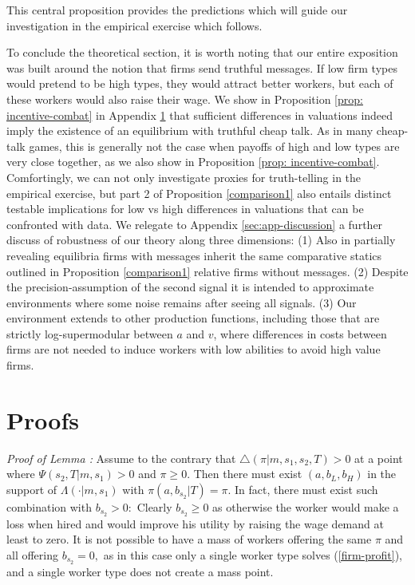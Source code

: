 \documentclass[12pt]{article}
\theoremstyle{plain}
\begin{document}
This central proposition provides the predictions which will guide our
investigation in the empirical exercise which follows. 

To conclude the theoretical section, it is worth noting
that our entire exposition was built around the notion that firms send truthful messages. If low firm types would pretend to be high types, they would attract better workers, but each of these workers would also raise their wage. We show in Proposition \ref{prop: incentive-combat} in Appendix \ref{sec:proofs} that sufficient differences in valuations indeed imply the
existence of an equilibrium with truthful cheap talk. As in
many cheap-talk games, this is generally not the case when payoffs of high
and low types are very close together, as we also show in Proposition \ref{prop: incentive-combat}. Comfortingly, we can not only investigate proxies for truth-telling in the empirical exercise, but part 2 of Proposition \ref{comparison1} also entails distinct testable implications for low vs high differences in valuations that can be confronted with data. We relegate to Appendix \ref{sec:app-discussion} a further discuss of robustness of our theory along three dimensions: (1) Also in partially revealing equilibria firms with messages inherit the same comparative statics outlined in Proposition \ref{comparison1} relative firms without messages. (2) Despite the precision-assumption of the second signal it is intended to approximate environments where some noise remains after seeing all signals. (3) Our environment extends to other production functions, including those that are strictly log-supermodular between $a$ and $v$, where differences in costs between firms are not needed to induce workers with low abilities to avoid high value firms. 



\bigskip




\newpage

\appendix

\bigskip

\section{Proofs} \label{sec:proofs}

\textit{Proof of Lemma%
:} Assume to the contrary
that $\bigtriangleup (\pi |m,s_{1},s_{2},T)>0$ at a point where $\Psi
(s_{2},T|m,s_{1})>0$ and $\pi \geq 0$. Then there must exist $%
(a,b_{L},b_{H}) $ in the support of $\Lambda (\cdot |m,s_{1})$ with $\pi
(a,b_{s_{2}}|T)=\pi .$ In fact, there must exist such combination with $%
b_{s_{2}}>0:$ Clearly $b_{s_{2}}\geq 0$ as otherwise the worker would make a
loss when hired and would improve his utility by raising the wage demand at
least to zero. It is not possible to have a mass of workers offering the
same $\pi $ and all offering $b_{s_{2}}=0,$ as in this case only a single
worker type solves (\ref{firm-profit}), and a single worker type does not
create a mass point.
\end{document}
